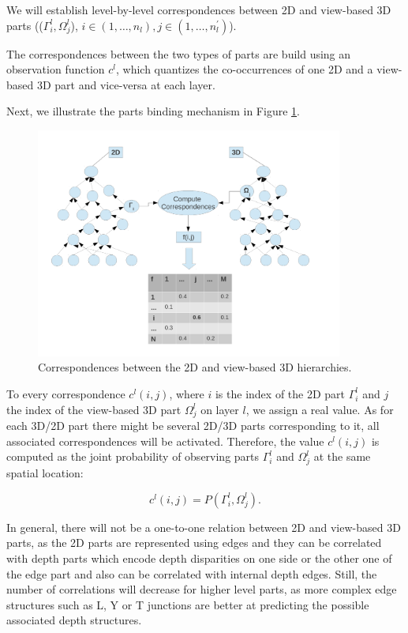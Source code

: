 \documentclass[runningheads]{llncs}
\begin{document}
We will establish level-by-level correspondences between 2D and view-based 3D  parts (($\Gamma_{i}^l,\Omega_{j}^l$), $i \in (1,\ldots,n_l), j \in (1,\ldots,n_{l}^{'})$).

The correspondences between the two types of parts are build using an observation function $c^l$, which quantizes the co-occurrences of one 2D and a view-based 3D part and vice-versa at each layer. 

Next, we illustrate the parts binding mechanism in Figure \ref{fig:fused-models}.

\begin{figure}
\begin{center}
\includegraphics[width=0.9\textwidth]{Fused_representation}
\end{center}
\caption{Correspondences between the 2D and view-based 3D hierarchies.}
\label{fig:fused-models}
\end{figure}

To every correspondence $c^l(i,j)$, where $i$ is the index of the 2D part $\Gamma_i^l$ and $j$ the index of the view-based 3D part $\Omega_j^l$ on layer $l$, we assign a real value. As for each 3D/2D part there might be several 2D/3D parts corresponding to it, all associated correspondences will be activated. Therefore, the value $c^l(i,j)$ is computed as the joint probability of observing parts $\Gamma_i^l$ and $\Omega_j^l$ at the same spatial location:

\begin{equation}
  c^l(i,j) = P(\Gamma_i^l,\Omega_j^l). 
 \end{equation} 

In general, there will not be a one-to-one relation between 2D and view-based 3D parts, as the 2D parts are represented using edges and they can be correlated with depth parts which encode depth disparities on one side or the other one of the edge part and also can be correlated with internal depth edges. Still, the number of correlations will decrease for higher level parts, as more complex edge structures such as L, Y or T junctions are better at predicting the possible associated depth structures.
\end{document}
